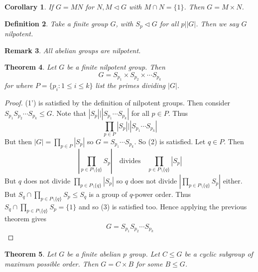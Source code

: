 \documentclass[a4paper,10pt]{article}
\newtheorem{thm}{Theorem}
\newtheorem{Def}[thm]{Definition}
\newtheorem{Cor}[thm]{Corollary}
\newtheorem{rem}[thm]{Remark}
\begin{document}
\begin{Cor}
If $G = MN$ for $N, M \triangleleft G$ with $M \cap N = \{1\}$. Then $G = M \times N$. 
\end{Cor}

\begin{Def}
Take a finite group $G$, with $S_p \triangleleft G$ for all $ p \big| |G|$. Then we say $G$ \textit{nilpotent}. 
\end{Def}
\begin{rem}
All abelian groups are nilpotent.
\end{rem}


\begin{thm}
Let $G$ be a finite nilpotent group. Then 
\[ G = S_{p_1} \times S_{p_2} \times \cdots S_{p_k} \]
for where $P = \{p_i : 1 \leq i \leq k\}$ list the primes dividing $|G|$.
\end{thm}

\begin{proof}
(1') is satisfied by the definition of nilpotent groups. Then consider $S_{p_1} S_{p_2} \cdots S_{p_k} \leq G$. Note that $| S_p| \big| |S_{p_1} \cdots S_{p_k}|$ for all $p \in P$. Thus
\[ \prod_{p \in P} |S_p| \Big| | S_{p_1} \cdots S_{p_k} | \]
But then $|G| = \prod_{p \in P} |S_p|$ so $G = S_{p_1} \cdots S_{p_k}$. So (2) is satisfied. Let $q \in P$. Then 
\[ \left| \prod_{p \in P \setminus \{ q\}} S_p \right| \quad \text{divides} \quad \prod_{p \in P \setminus \{ q\}} |S_p| \]
But $q$ does not divide $\prod_{p \in P \setminus \{ q\}} |S_p|$ so $q$ does not divide $\left|\prod_{p \in P \setminus \{ q\}} S_p \right|$ either. But $S_q \cap \prod_{p \in P \setminus \{ q\}} S_p \leq S_q$ is a group of $q$-power order. Thus $S_q \cap \prod_{p \in P \setminus \{ q\}} S_p = \{ 1 \}$ and so (3) is satisfied too. Hence applying the previous theorem gives
\[ G = S_{p_1} S_{p_2} \cdots S_{p_k} \]
\end{proof}


\begin{thm}
Let $G$ be a finite abelian $p$ group. Let $C \leq G$ be a cyclic subgroup of maximum possible order. Then $G = C \times B$ for some $B \leq G$.
\end{thm}
\end{document}
